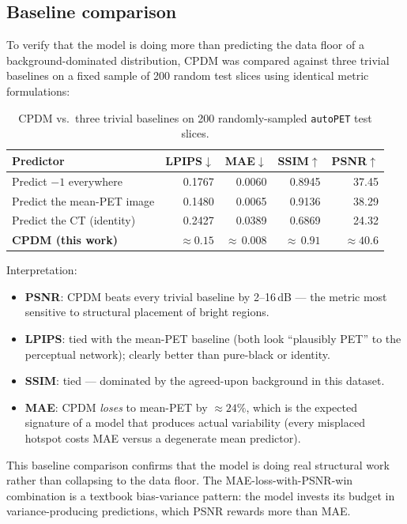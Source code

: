 \documentclass[11pt,a4paper]{article}
\begin{document}
\subsection{Baseline comparison}
\label{sec:baselines}

To verify that the model is doing more than predicting the data floor of a 
background-dominated distribution, CPDM was compared against three trivial 
baselines on a fixed sample of 200 random test slices using identical metric 
formulations:

\begin{table}[h]
\centering
\small
\begin{tabular}{lrrrr}
\toprule
Predictor & LPIPS$\downarrow$ & MAE$\downarrow$ & SSIM$\uparrow$ & PSNR$\uparrow$ \\
\midrule
Predict $-1$ everywhere      & 0.1767 & 0.0060 & 0.8945 & 37.45 \\
Predict the mean-PET image   & 0.1480 & 0.0065 & 0.9136 & 38.29 \\
Predict the CT (identity)    & 0.2427 & 0.0389 & 0.6869 & 24.32 \\
\textbf{CPDM (this work)}    & $\mathbf{\approx 0.15}$ & ${\approx}\,0.008$ & ${\approx}\,0.91$ & $\mathbf{\approx 40.6}$ \\
\bottomrule
\end{tabular}
\caption{CPDM vs.\ three trivial baselines on 200 randomly-sampled \texttt{autoPET} test slices.}
\label{tab:baselines}
\end{table}

Interpretation:
\begin{itemize}
  \item \textbf{PSNR}: CPDM beats every trivial baseline by 2--16\,dB --- the metric most sensitive to structural placement of bright regions.
  \item \textbf{LPIPS}: tied with the mean-PET baseline (both look ``plausibly PET'' to the perceptual network); clearly better than pure-black or identity.
  \item \textbf{SSIM}: tied --- dominated by the agreed-upon background in this dataset.
  \item \textbf{MAE}: CPDM \emph{loses} to mean-PET by ${\approx}24\%$, which is the expected signature of a model that produces actual variability (every misplaced hotspot costs MAE versus a degenerate mean predictor).
\end{itemize}

This baseline comparison confirms that the model is doing real structural work rather than collapsing to the data floor. The MAE-loss-with-PSNR-win combination is a textbook bias-variance pattern: the model invests its budget in variance-producing predictions, which PSNR rewards more than MAE.
\end{document}
